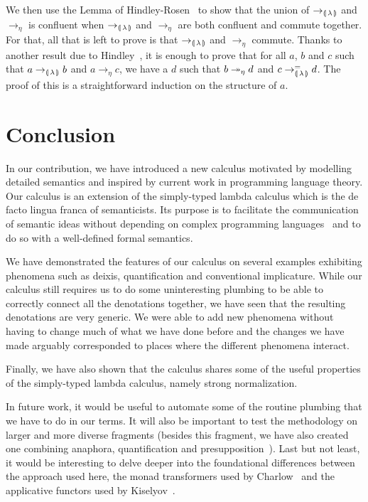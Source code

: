 \documentclass{llncs}
\begin{document}
We then use the Lemma of Hindley-Rosen~\cite[p. 7]{klop1992term} to show
that the union of $\to_{\llparenthesis \, \lambda \, \rrparenthesis}$ and $\to_\eta$ is confluent when
$\to_{\llparenthesis \, \lambda \, \rrparenthesis}$ and $\to_\eta$ are both confluent and commute
together. For that, all that is left to prove is that
$\to_{\llparenthesis \, \lambda \, \rrparenthesis}$ and $\to_\eta$ commute. Thanks to another result
due to Hindley~\cite[p. 8]{klop1992term}, it is enough to prove that for
all $a$, $b$ and $c$ such that $a \to_{\llparenthesis \, \lambda \, \rrparenthesis} b$ and $a \to_\eta
c$, we have a $d$ such that $b \twoheadrightarrow_\eta d$ and $c \to^=_{\llparenthesis \, \lambda \, \rrparenthesis}
d$. The proof of this is a straightforward induction on the structure of
$a$.


\section{Conclusion}
\label{sec:conclusion}

In our contribution, we have introduced a new calculus motivated by
modelling detailed semantics and inspired by current work in programming
language theory. Our calculus is an extension of the simply-typed lambda
calculus which is the de facto lingua franca of semanticists. Its purpose
is to facilitate the communication of semantic ideas without depending on
complex programming languages~\cite{marsik2014algebraic,kiselyov2010lambda}
and to do so with a well-defined formal semantics.

We have demonstrated the features of our calculus on several examples
exhibiting phenomena such as deixis, quantification and conventional
implicature. While our calculus still requires us to do some uninteresting
plumbing to be able to correctly connect all the denotations together, we
have seen that the resulting denotations are very generic. We were able to
add new phenomena without having to change much of what we have done before
and the changes we have made arguably corresponded to places where the
different phenomena interact.

Finally, we have also shown that the calculus shares some of the useful
properties of the simply-typed lambda calculus, namely strong
normalization.

In future work, it would be useful to automate some of the routine plumbing
that we have to do in our terms. It will also be important to test the
methodology on larger and more diverse fragments (besides this fragment, we
have also created one combining anaphora, quantification and
presupposition~\cite{marsik2014algebraic}). Last but not least, it would be
interesting to delve deeper into the foundational differences between the
approach used here, the monad transformers used by
Charlow~\cite{charlow2014semantics} and the applicative functors used by
Kiselyov~\cite{kiselyov2015applicative}.


%
%


\end{document}
